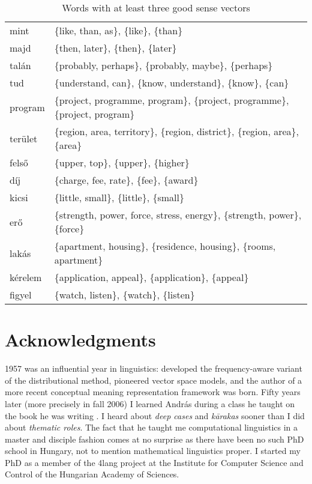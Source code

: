 \documentclass[11pt]{article}
\begin{document}
\begin{table} \footnotesize
  \begin{tabular}{ll}
    \toprule
mint	& \{like, than, as\}, \{like\}, \{than\}	\\
majd	& \{then, later\}, \{then\}, \{later\}	\\
talán	& \{probably, perhaps\}, \{probably, maybe\}, \{perhaps\}	\\
tud	& \{understand, can\}, \{know, understand\}, \{know\}, \{can\}	\\
program	& \{project, programme, program\}, \{project, programme\}, \{project, program\}	\\
terület	& \{region, area, territory\}, \{region, district\}, \{region, area\}, \{area\}	\\
felső	& \{upper, top\}, \{upper\}, \{higher\}	\\
díj	& \{charge, fee, rate\}, \{fee\}, \{award\}	\\
kicsi	& \{little, small\}, \{little\}, \{small\}	\\
erő	& \{strength, power, force, stress, energy\}, \{strength, power\}, \{force\}	\\
lakás	& \{apartment, housing\}, \{residence, housing\}, \{rooms, apartment\}	\\
kérelem	& \{application, appeal\}, \{application\}, \{appeal\}	\\
figyel	& \{watch, listen\}, \{watch\}, \{listen\}	\\
\bottomrule
\end{tabular}
  \caption{Words with at least three good sense vectors}
  \label{tab:like_than} 
\end{table}

\section{Acknowledgments}

1957 was an influential year in linguistics: \cite{Harris:1957} developed the
frequency-aware variant of the distributional method, \cite{Osgood:1957}
pioneered vector space models, and the author of a more recent conceptual
meaning representation framework \citep{Kornai:2010,Kornai:2017} was born.
Fifty years later (more precisely in fall 2006) I learned András during a class
he taught on the book he was writing \citep{Kornai:2007}. I heard about
\emph{deep cases} and \emph{k\={a}rakas} sooner than I did about \emph{thematic
roles}. The fact that he taught me computational linguistics in a master and
disciple fashion comes at no surprise as there have been no such PhD school in
Hungary, not to mention mathematical linguistics proper.  
I started my PhD as a member of the 4lang project at the Institute for Computer
Science and Control of the Hungarian Academy of Sciences. 
\end{document}
